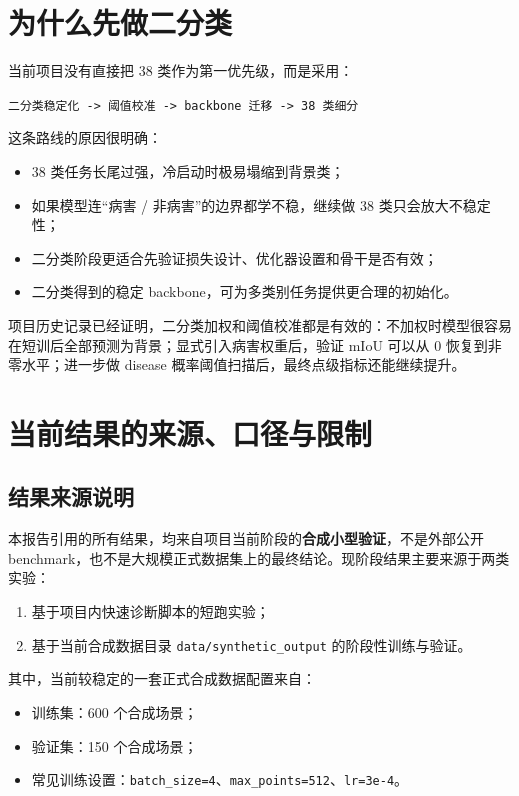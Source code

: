 \documentclass[12pt]{ctexart}
\begin{document}
\section{为什么先做二分类}

当前项目没有直接把 38 类作为第一优先级，而是采用：

\begin{center}
\texttt{二分类稳定化 -> 阈值校准 -> backbone 迁移 -> 38 类细分}
\end{center}

这条路线的原因很明确：

\begin{itemize}
  \item 38 类任务长尾过强，冷启动时极易塌缩到背景类；
  \item 如果模型连“病害 / 非病害”的边界都学不稳，继续做 38 类只会放大不稳定性；
  \item 二分类阶段更适合先验证损失设计、优化器设置和骨干是否有效；
  \item 二分类得到的稳定 backbone，可为多类别任务提供更合理的初始化。
\end{itemize}

项目历史记录已经证明，二分类加权和阈值校准都是有效的：不加权时模型很容易在短训后全部预测为背景；显式引入病害权重后，验证 mIoU 可以从 0 恢复到非零水平；进一步做 disease 概率阈值扫描后，最终点级指标还能继续提升。

\section{当前结果的来源、口径与限制}

\subsection{结果来源说明}

本报告引用的所有结果，均来自项目当前阶段的\textbf{合成小型验证}，不是外部公开 benchmark，也不是大规模正式数据集上的最终结论。现阶段结果主要来源于两类实验：

\begin{enumerate}
  \item 基于项目内快速诊断脚本的短跑实验；
  \item 基于当前合成数据目录 \texttt{data/synthetic\_output} 的阶段性训练与验证。
\end{enumerate}

其中，当前较稳定的一套正式合成数据配置来自：

\begin{itemize}
  \item 训练集：600 个合成场景；
  \item 验证集：150 个合成场景；
  \item 常见训练设置：\texttt{batch\_size=4}、\texttt{max\_points=512}、\texttt{lr=3e-4}。
\end{itemize}
\end{document}
